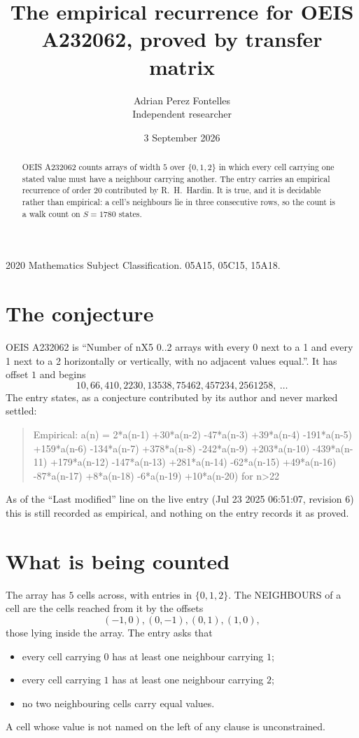 \documentclass[11pt,a4paper]{article}
\title{The empirical recurrence for OEIS A232062, proved by transfer matrix}
\author{Adrian Perez Fontelles\\ \small Independent researcher}
\date{3 September 2026}
\theoremstyle{plain}
\theoremstyle{definition}
\begin{document}
\maketitle

\begin{abstract}
OEIS A232062 counts arrays of width $5$ over $\{0,1,2\}$ in which every cell carrying one stated
value must have a neighbour carrying another. The entry carries an empirical recurrence of
order $20$ contributed by R.~H.~Hardin. It is true, and it is decidable rather than
empirical: a cell's neighbours lie in three consecutive rows, so the count is a walk count on
$S=1780$ states.
\end{abstract}

\noindent\small 2020 Mathematics Subject Classification. 05A15, 05C15, 15A18.\normalsize

\section{The conjecture}

OEIS A232062 is ``Number of nX5 0..2 arrays with every 0 next to a 1 and every 1 next to a 2 horizontally or vertically, with no adjacent values equal.''. It has offset $1$ and begins
\[
10, 66, 410, 2230, 13538, 75462, 457234, 2561258,\ \dots
\]
The entry states, as a conjecture contributed by its author and never marked settled:
\begin{quote}
Empirical: a(n) = 2*a(n-1) +30*a(n-2) -47*a(n-3) +39*a(n-4) -191*a(n-5) +159*a(n-6) -134*a(n-7) +378*a(n-8) -242*a(n-9) +203*a(n-10) -439*a(n-11) +179*a(n-12) -147*a(n-13) +281*a(n-14) -62*a(n-15) +49*a(n-16) -87*a(n-17) +8*a(n-18) -6*a(n-19) +10*a(n-20) for n>22
\end{quote}
As of the ``Last modified'' line on the live entry (Jul 23 2025 06:51:07, revision 6) this is still
recorded as empirical, and nothing on the entry records it as proved.

\section{What is being counted}

The array has $5$ cells across, with entries in $\{0,1,2\}$. The NEIGHBOURS of a cell are the
cells reached from it by the offsets
\[
(-1,0), (0,-1), (0,1), (1,0),
\]
those lying inside the array. The entry asks that
\begin{itemize}
\item every cell carrying $0$ has at least one neighbour carrying $1$;
\item every cell carrying $1$ has at least one neighbour carrying $2$;
\item no two neighbouring cells carry equal values.
\end{itemize}
A cell whose value is not named on the left of any clause is unconstrained.
\end{document}
